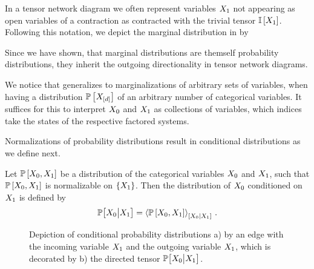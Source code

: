 In a tensor network diagram we often represent variables $X_{1}$ not appearing as open variables of a contraction as contracted with the trivial tensor $\mathbb{I}\left[X_{1}\right]$.
Following this notation, we depict the marginal distribution in  by
\begin{center}
    
\end{center}
Since we have shown, that marginal distributions are themself probability distributions, they inherit the outgoing directionality in tensor network diagrams.

We notice that  generalizes to marginalizations of arbitrary sets of variables, when having a distribution $\mathbb{P}\left[X_{[d]}\right]$ of an arbitrary number of categorical variables.
It suffices for this to interpret $X_{0}$ and $X_{1}$ as collections of variables, which indices take the states of the respective factored systems.


Normalizations of probability distributions result in conditional distributions as we define next.

\begin{definition}
    \label{def:conditionalProbability}
    Let $\mathbb{P}\left[X_{0},X_{1}\right]$ be a distribution of the categorical variables $X_{0}$ and $X_{1}$, such that $\mathbb{P}\left[X_{0},X_{1}\right]$ is normalizable on $\{X_{1}\}$.
    Then the distribution of $X_{0}$ conditioned on $X_{1}$ is defined by
    \begin{align*}
        \mathbb{P}\big[X_{0}\big|X_{1}\big]
        = \left\langle \mathbb{P}\left[X_{0},X_{1}\right]\right\rangle_{\left[ X_{0} | X_{1} \right]} \, .
    \end{align*}
\end{definition}

\begin{figure}[t]
    \begin{center}
        
    \end{center}
    \caption{Depiction of conditional probability distributions a) by an edge with the incoming variable $X_{1}$ and the outgoing variable $X_{1}$, which is decorated by b) the directed tensor $\mathbb{P}\big[X_{0}\big|X_{1}\big]$. }
    \label{fig:conditionalDistribution}
\end{figure}

